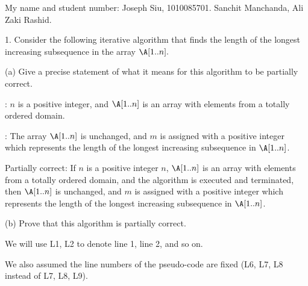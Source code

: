\documentclass[11pt, sakura, night, 1in]{hw}
\begin{document}
My name and student number: Joseph Siu, 1010085701. Sanchit Manchanda, Ali Zaki Rashid.

1. Consider the following iterative algorithm that finds the length of the longest increasing subsequence in the array $\A[1..n].$


(a) Give a precise statement of what it means for this algorithm to be partially correct.

\Precon: $n$ is a positive integer, and $\A[1..n]$ is an array with elements from a totally ordered domain.

\Postcon: The array $\A[1..n]$ is unchanged, and $m$ is assigned with a positive integer which represents the length of the longest increasing subsequence in $\A[1..n]$.

Partially correct: If $n$ is a positive integer $n$, $\A[1..n]$ is an array with elements from a totally ordered domain, and the algorithm is executed and terminated, then $\A[1..n]$ is unchanged, and $m$ is assigned with a positive integer which represents the length of the longest increasing subsequence in $\A[1..n]$. 


(b) Prove that this algorithm is partially correct.

We will use L1, L2 to denote line 1, line 2, and so on.

We also assumed the line numbers of the pseudo-code are fixed (L6, L7, L8 instead of L7, L8, L9).

\end{document}
